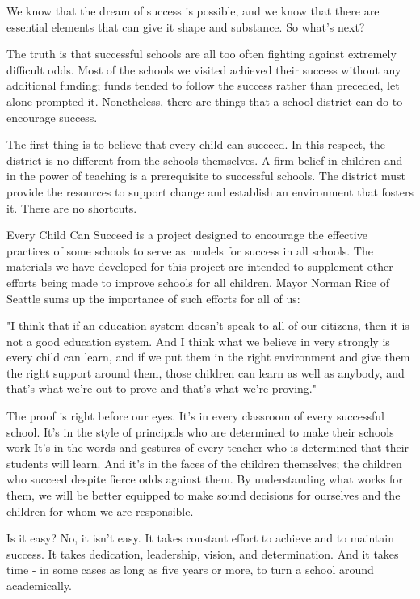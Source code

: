 We know that the dream of success is possible, and we know that there are essential elements that can give it shape and substance.
So what's next?

The truth is that successful schools are all too often fighting against extremely difficult odds.
Most of the schools we visited achieved their success without any additional funding; funds tended to follow the success rather than preceded, let alone prompted it.
Nonetheless, there are things that a school district can do to encourage success.

The first thing is to believe that every child can succeed.
In this respect, the district is no different from the schools themselves.
A firm belief in children and in the power of teaching is a prerequisite to successful schools.
The district must provide the resources to support change and establish an environment that fosters it.
There are no shortcuts.

Every Child Can Succeed is a project designed to encourage the effective practices of some schools to serve as models for success in all schools.
The materials we have developed for this project are intended to supplement other efforts being made to improve schools for all children.
Mayor Norman Rice of Seattle sums up the importance of such efforts for all of us:

"I think that if an education system doesn't speak to all of our citizens, then it is not a good education system.
And I think what we believe in very strongly is every child can learn, and if we put them in the right environment and give them the right support around them, those children can learn as well as anybody, and that's what we're out to prove and that's what we're proving."

The proof is right before our eyes.
It's in every classroom of every successful school.
It's in the style of principals who are determined to make their schools work
It's in the words and gestures of every teacher who is determined that their students will learn.
And it's in the faces of the children themselves; the children who succeed despite fierce odds against them.
By understanding what works for them, we will be better equipped to make sound decisions for ourselves and the children for whom we are responsible.

Is it easy?
No, it isn't easy.
It takes constant effort to achieve and to maintain success.
It takes dedication, leadership, vision, and determination.
And it takes time - in some cases as long as five years or more, to turn a school around academically.

